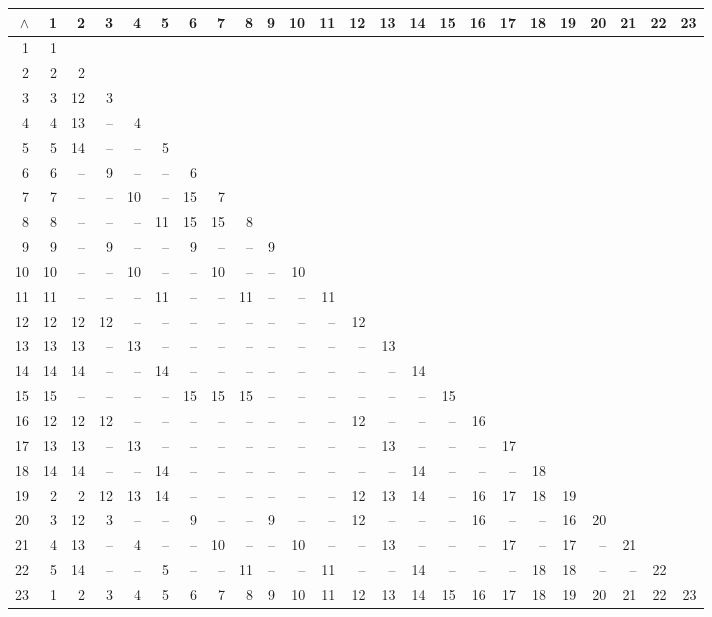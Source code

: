 \documentclass[11pt,a4paper]{article}
\theoremstyle{definition}
\begin{document}
\begin{center}\scriptsize\setlength{\tabcolsep}{2pt}
\begin{tabular}{r|rrrrrrrrrrrrrrrrrrrrrrr}
$\wedge$&1&2&3&4&5&6&7&8&9&10&11&12&13&14&15&16&17&18&19&20&21&22&23\\\hline
1&1&&&&&&&&&&&&&&&&&&&&&&\\
2&2&2&&&&&&&&&&&&&&&&&&&&&\\
3&3&12&3&&&&&&&&&&&&&&&&&&&&\\
4&4&13&--&4&&&&&&&&&&&&&&&&&&&\\
5&5&14&--&--&5&&&&&&&&&&&&&&&&&&\\
6&6&--&9&--&--&6&&&&&&&&&&&&&&&&&\\
7&7&--&--&10&--&15&7&&&&&&&&&&&&&&&&\\
8&8&--&--&--&11&15&15&8&&&&&&&&&&&&&&&\\
9&9&--&9&--&--&9&--&--&9&&&&&&&&&&&&&&\\
10&10&--&--&10&--&--&10&--&--&10&&&&&&&&&&&&&\\
11&11&--&--&--&11&--&--&11&--&--&11&&&&&&&&&&&&\\
12&12&12&12&--&--&--&--&--&--&--&--&12&&&&&&&&&&&\\
13&13&13&--&13&--&--&--&--&--&--&--&--&13&&&&&&&&&&\\
14&14&14&--&--&14&--&--&--&--&--&--&--&--&14&&&&&&&&&\\
15&15&--&--&--&--&15&15&15&--&--&--&--&--&--&15&&&&&&&&\\
16&12&12&12&--&--&--&--&--&--&--&--&12&--&--&--&16&&&&&&&\\
17&13&13&--&13&--&--&--&--&--&--&--&--&13&--&--&--&17&&&&&&\\
18&14&14&--&--&14&--&--&--&--&--&--&--&--&14&--&--&--&18&&&&&\\
19&2&2&12&13&14&--&--&--&--&--&--&12&13&14&--&16&17&18&19&&&&\\
20&3&12&3&--&--&9&--&--&9&--&--&12&--&--&--&16&--&--&16&20&&&\\
21&4&13&--&4&--&--&10&--&--&10&--&--&13&--&--&--&17&--&17&--&21&&\\
22&5&14&--&--&5&--&--&11&--&--&11&--&--&14&--&--&--&18&18&--&--&22&\\
23&1&2&3&4&5&6&7&8&9&10&11&12&13&14&15&16&17&18&19&20&21&22&23\\
\end{tabular}\end{center}
\end{document}
